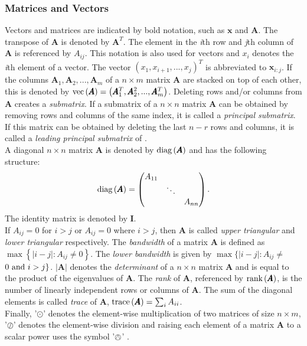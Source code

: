 \subsubsection*{Matrices and Vectors}
Vectors and matrices are indicated by bold notation, such as $\pmb{x}$ and $\pmb{A}$. The transpose of $\pmb{A}$ is denoted by $\pmb{A}^T$. The element in the \textit{i}th row and \textit{j}th column of $\pmb{A}$ is referenced by $A_{ij}$. This notation is also used for vectors and $x_i$ denotes the \textit{i}th element of a vector. The vector $\left(x_1,x_{i+1},...,x_j\right)^T$ is abbreviated to $\pmb{x}_{i:j}$. If the columns $\pmb{A}_1, \pmb{A}_2,...,\pmb{A}_m$ of a $n\times m$ matrix $\pmb{A}$ are stacked on top of each other, this is denoted by $\hbox{vec}\left(\pmb{A}\right)=\left(\pmb{A}_1^T,\pmb{A}_2^2,...,\pmb{A}_m^T\right)$. Deleting rows and/or columns from $\pmb{A}$ creates a \textit{submatrix}. If a submatrix of a $n\times n$ matrix $\pmb{A}$ can be obtained by removing rows and columns of the same index, it is called a \textit{principal submatrix}. If this matrix can be obtained by deleting the last $n-r$ rows and columns, it is called a \textit{leading principal submatrix} of . \\
A diagonal $n\times n$ matrix $\pmb{A}$ is denoted by $\hbox{diag}\left(\pmb{A}\right)$ and has the following structure:
\begin{equation*}
    \hbox{diag}\left(\pmb{A}\right)=\begin{pmatrix}
    A_{11} \\
    & \ddots \\
    &&A_{nn}
    \end{pmatrix}.
\end{equation*}
The identity matrix is denoted by $\pmb{I}$. \\
If $A_{ij}=0$ for $i>j$ or $A_{ij} = 0$ where $i>j$, then $\pmb{A}$ is called \textit{upper triangular} and \textit{lower triangular} respectively. The \textit{bandwidth} of a matrix $\pmb{A}$ is defined as $\max\left\lbrace|i-j|:A_{ij}\neq0\right\rbrace$. The \textit{lower bandwidth} is given by $\max\lbrace|i-j|:A_{ij}\neq $ $0\hbox{ and } i > j\rbrace$. $|\pmb{A}|$ denotes the \textit{determinant} of a $n\times n$ matrix $\pmb{A}$ and is equal to the product of the eigenvalues of $\pmb{A}$. The \textit{rank} of $\pmb{A}$, referenced by $\hbox{rank}\left(\pmb{A}\right)$, is the number of linearly independent rows or columns of $\pmb{A}$. The sum of the diagonal elements is called \textit{trace} of $\pmb{A}$, $\hbox{trace}\left(\pmb{A}\right)=\sum_{i}A_{ii}$.\\
Finally, '$\odot$' denotes the element-wise multiplication of two matrices of size $n\times m$, '$\oslash$' denotes the element-wise division and raising each element of a matrix $\pmb{A}$ to a scalar power uses the symbol '$\owedge$'  \autocite[][14--15]{rue2005gaussian}.
